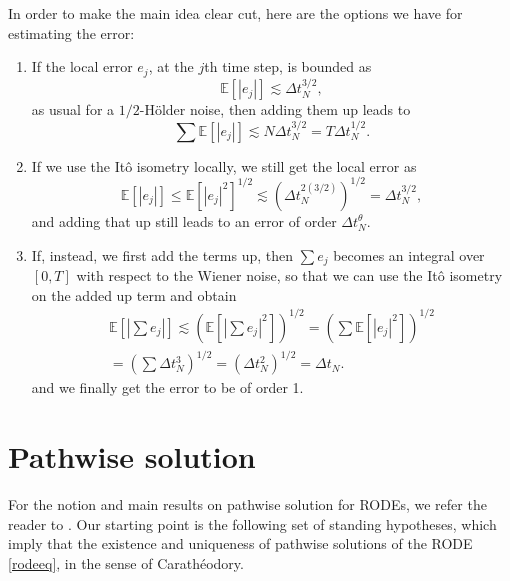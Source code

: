 \documentclass[reqno,12pt]{amsart}
\theoremstyle{plain}%
\theoremstyle{definition}
\begin{document}
In order to make the main idea clear cut, here are the options we have for estimating the error:
\begin{enumerate}
  \item If the local error $e_j$, at the $j$th time step, is bounded as
    $$
    \mathbb{E}[|e_j|] \lesssim \Delta t_N^{3/2},
    $$
    as usual for a $1/2$-H\"older noise, then adding them up leads to 
    $$
      \sum \mathbb{E}[|e_j|] \lesssim N\Delta t_N^{3/2} = T\Delta t_N^{1/2}.
    $$
    \item If we use the It\^o isometry locally, we still get the local error as
    $$
      \mathbb{E}[|e_j|] \leq \mathbb{E}[|e_j|^2]^{1/2} \lesssim \left(\Delta t_N^{2(3/2)} \right)^{1/2} = \Delta t_N^{3/2},
    $$
    and adding that up still leads to an error of order $\Delta t_N^{\theta}$.
    \item If, instead, we first add the terms up, then $\sum e_j$ becomes an integral over $[0, T]$ with respect to the Wiener noise, so that we can use the It\^o isometry on the added up term and obtain
    \begin{multline*}
      \mathbb{E}\left[ \left| \sum e_j \right| \right] \lesssim \left(\mathbb{E}\left[ \left| \sum e_j \right|^2 \right]\right)^{1/2} = \left( \sum \mathbb{E}[|e_j|^2] \right)^{1/2} \\
      = \left( \sum \Delta t_N^3 \right)^{1/2} = \left( \Delta t_N^2 \right)^{1/2} = \Delta t_N.
    \end{multline*}
    and we finally get the error to be of order 1.
\end{enumerate}

\section{Pathwise solution}
\label{secpathwisesolution}

For the notion and main results on pathwise solution for RODEs, we refer the reader to \cite[Section 2.1]{HanKloeden2017}. Our starting point is the following set of standing hypotheses, which imply that the existence and uniqueness of pathwise solutions of the RODE \eqref{rodeeq}, in the sense of Carath\'eodory.
\end{document}
